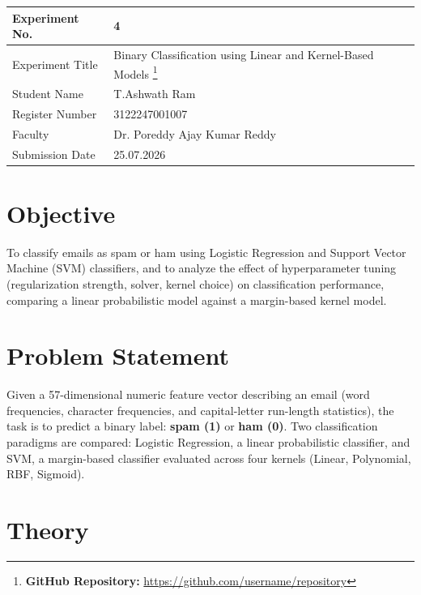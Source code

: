 \documentclass[12pt,a4paper]{article}
\begin{document}
\begin{tabular}{|p{4cm}|p{11cm}|}
\hline
Experiment No. & 4 \\ \hline
Experiment Title & Binary Classification using Linear and Kernel-Based Models
\footnote{\textbf{GitHub Repository: }\url{https://github.com/username/repository}}\\ \hline
Student Name & T.Ashwath Ram\\ \hline
Register Number & 3122247001007\\ \hline
Faculty & Dr. Poreddy Ajay Kumar Reddy \\ \hline
Submission Date & 25.07.2026 \\ \hline
\end{tabular}

\section{Objective}
To classify emails as spam or ham using Logistic Regression and Support Vector Machine (SVM)
classifiers, and to analyze the effect of hyperparameter tuning (regularization strength,
solver, kernel choice) on classification performance, comparing a linear probabilistic model
against a margin-based kernel model.

\section{Problem Statement}
Given a 57-dimensional numeric feature vector describing an email (word frequencies, character
frequencies, and capital-letter run-length statistics), the task is to predict a binary label:
\textbf{spam (1)} or \textbf{ham (0)}. Two classification paradigms are compared: Logistic
Regression, a linear probabilistic classifier, and SVM, a margin-based classifier evaluated
across four kernels (Linear, Polynomial, RBF, Sigmoid).

\section{Theory}
\end{document}
